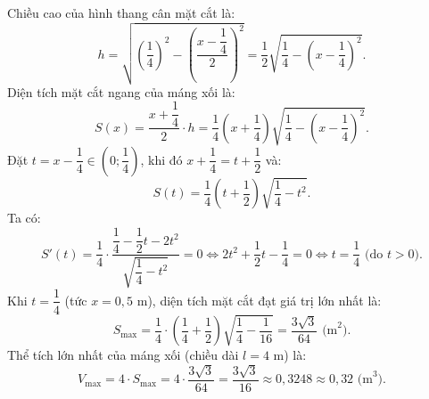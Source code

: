 \begin{ex}
{		Chiều cao của hình thang cân mặt cắt là:
		$$h = \sqrt{\left(\dfrac{1}{4}\right)^2 - \left(\dfrac{x - \dfrac{1}{4}}{2}\right)^2} = \dfrac{1}{2}\sqrt{\dfrac{1}{4} - \left(x - \dfrac{1}{4}\right)^2}.$$
		Diện tích mặt cắt ngang của máng xối là:
		$$S(x) = \dfrac{x + \dfrac{1}{4}}{2} \cdot h = \dfrac{1}{4}\left(x + \dfrac{1}{4}\right)\sqrt{\dfrac{1}{4} - \left(x - \dfrac{1}{4}\right)^2}.$$
		Đặt $t = x - \dfrac{1}{4} \in \left(0; \dfrac{1}{4}\right)$, khi đó $x + \dfrac{1}{4} = t + \dfrac{1}{2}$ và:
		$$S(t) = \dfrac{1}{4}\left(t + \dfrac{1}{2}\right)\sqrt{\dfrac{1}{4} - t^2}.$$
		Ta có:
		$$S'(t) = \dfrac{1}{4}\cdot\dfrac{\dfrac{1}{4} - \dfrac{1}{2}t - 2t^2}{\sqrt{\dfrac{1}{4} - t^2}} = 0 \iff 2t^2 + \dfrac{1}{2}t - \dfrac{1}{4} = 0 \iff t = \dfrac{1}{4}\text{ (do } t > 0\text{)}.$$
		Khi $t = \dfrac{1}{4}$ (tức $x = 0{,}5\text{ m}$), diện tích mặt cắt đạt giá trị lớn nhất là:
		$$S_{\max} = \dfrac{1}{4}\cdot\left(\dfrac{1}{4} + \dfrac{1}{2}\right)\sqrt{\dfrac{1}{4} - \dfrac{1}{16}} = \dfrac{3\sqrt{3}}{64}\text{ (m}^2\text{)}.$$
		Thể tích lớn nhất của máng xối (chiều dài $l = 4\text{ m}$) là:
		$$V_{\max} = 4 \cdot S_{\max} = 4 \cdot \dfrac{3\sqrt{3}}{64} = \dfrac{3\sqrt{3}}{16} \approx 0{,}3248 \approx 0{,}32\text{ (m}^3\text{)}.$$
	}
\end{ex}
